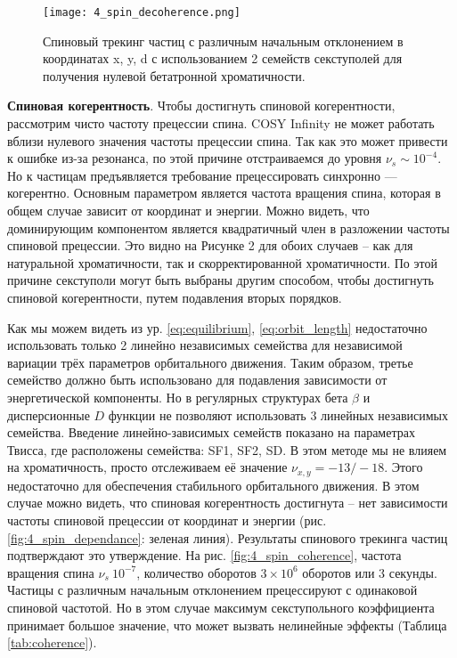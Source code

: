 \begin{figure}[!h]
  \centering
   \texttt{[image: 4\_spin\_decoherence.png]}
   \caption{Спиновый трекинг частиц с различным начальным отклонением в координатах x, y, d с использованием 2 семейств секступолей для получения нулевой бетатронной хроматичности.}
   \label{fig:4_spin_decoherence}
\end{figure}

\textbf{Спиновая когерентность}. Чтобы достигнуть спиновой когерентности, рассмотрим чисто частоту прецессии спина. COSY Infinity \cite{cosy} не может работать вблизи нулевого значения частоты прецессии спина. Так как это может привести к ошибке из-за резонанса, по этой причине отстраиваемся до уровня $\nu_s\sim{10}^{-4}$. Но к частицам предъявляется требование прецессировать синхронно — когерентно. Основным параметром является частота вращения спина, которая в общем случае зависит от координат и энергии. Можно видеть, что доминирующим компонентом является квадратичный член в разложении частоты спиновой прецессии. Это видно на Рисунке 2 для обоих случаев – как для натуральной хроматичности, так и скорректированной хроматичности. По этой причине секступоли могут быть выбраны другим способом, чтобы достигнуть спиновой когерентности, путем подавления вторых порядков.

\par Как мы можем видеть из ур. \ref{eq:equilibrium}, \ref{eq:orbit_length} недостаточно использовать только 2 линейно независимых семейства для независимой вариации трёх параметров орбитального движения. Таким образом, третье семейство должно быть использовано для подавления зависимости от энергетической компоненты. Но в регулярных структурах бета $\beta$ и дисперсионные $D$ функции не позволяют использовать 3 линейных независимых семейства. Введение линейно-зависимых семейств показано на параметрах Твисса, где расположены семейства: SF1, SF2, SD. В этом методе мы не влияем на хроматичность, просто отслеживаем её значение $\nu_{x,y}=-13/-18$. Этого недостаточно для обеспечения стабильного орбитального движения. В этом случае можно видеть, что спиновая когерентность достигнута -- нет зависимости частоты спиновой прецессии от координат и энергии (рис. \ref{fig:4_spin_dependance}: зеленая линия). Результаты спинового трекинга частиц подтверждают это утверждение. На рис. \ref{fig:4_spin_coherence}, частота вращения спина $\nu_s~{10}^{-7}$, количество оборотов $3\times{10}^6$ оборотов или $3$ секунды. Частицы с различным начальным отклонением прецессируют с одинаковой спиновой частотой. Но в этом случае максимум секступольного коэффициента принимает большое значение, что может вызвать нелинейные эффекты (Таблица \ref{tab:coherence}).


